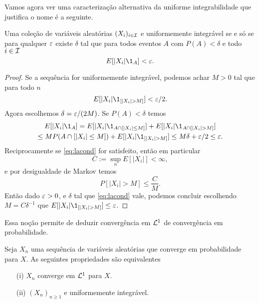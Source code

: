 Vamos agora ver uma caracterização alternativa da uniforme integrabilidade que justifica o nome é a seguinte.


\begin{proposition}
 Uma coleção de variáveis aleatórias $(X_i)_{i\in {\ensuremath{\mathcal I}}}$  e uniformemente integrável se 
 e só se para qualquer $\varepsilon$ existe $\delta$ tal que para todos eventos  $A$ com $P(A)<\delta$ e todo $i \in {\ensuremath{\mathcal I}}$
  \begin{equation}\label{eq:lacond}
  E[|X_i|\1_{A}]<\gep.
 \end{equation}
 \end{proposition}

 \begin{proof}
 Se a sequência for uniformemente integrável,
 podemos achar $M>0$ tal que para todo $n$
 \begin{equation}
  E[|X_i|\1_{[|X_i|> M]}]<\gep/2.
 \end{equation}
Agora escolhemos $\delta=\varepsilon/(2M)$.
Se  $P(A)<\delta$ temos 
\begin{multline}
 E[|X_i|\1_{A}]= E[|X_i|\1_{A\cap [|X_i|\le  M]}]+E[|X_i|\1_{A\cap [|X_i|>  M]}]\\
 \le M P(A\cap [|X_i|\le  M])+ E[|X_i|\1_{[|X_i|>  M]}]\le M\delta +\gep/2\le \gep.
\end{multline}
Reciprocamente se \eqref{eq:lacond} for satisfeito, então em particular
$$ C:=\sup_n E[|X_i|]<\infty,$$
e por desigualdade de Markov temos
\begin{equation*}
 P[|X_i|> M] \le \frac{C}{M}.
\end{equation*}
Então dado $\varepsilon>0$, e $\delta$ tal que \eqref{eq:lacond} vale,
podemos concluir escolhendo $M=C\delta^{-1}$ que 
$E[|X_i|\1_{[|X_i|> M]}]\le \gep$.
\end{proof}

Essa noção permite de deduzir convergência em ${\mathcal L}^1$ de convergência em probabilidade.

\begin{theorem}
 Seja $X_n$ uma sequência de variáveis aleatórias que converge em probabilidade para $X$.
 As seguintes propriedades são equivalentes
 \begin{itemize}
  \item [(i)] $X_n$ converge em ${\mathcal L}^1$ para $X$.
  \item [(ii)] $(X_n)_{n\ge 1}$ e uniformemente integrável.
 \end{itemize}

 
 
 
\end{theorem}


